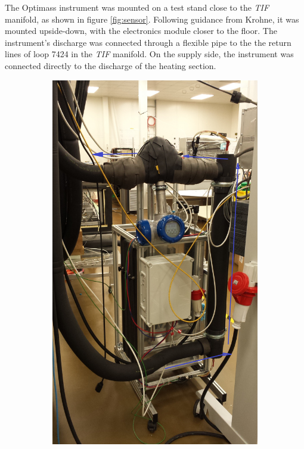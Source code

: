 \documentclass{report}
\begin{document}
The Optimass instrument was mounted on a test stand close to the \textit{TIF} manifold, as shown in figure \ref{fig:sensor}. Following guidance from Krohne, it was mounted upside-down, with the electronics module closer to the floor. The instrument's discharge was connected through a flexible pipe to the the return lines of loop 7424 in the \textit{TIF} manifold. On the supply side, the instrument was connected directly to the discharge of the heating section. 
\begin{figure}
        \centering
        \begin{subfigure}[b]{0.5\textwidth}
                \includegraphics[width=\textwidth]{sensor}

\end{subfigure}
\end{figure}
\end{document}

